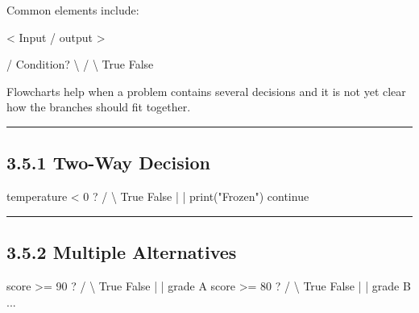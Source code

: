 \documentclass[
  11pt,
  a4paper,
]{article}
\newenvironment{Shaded}{}{}
\newcommand{\NormalTok}[1]{#1}
\begin{document}
Common elements include:

\begin{Shaded}
\begin{Highlighting}[]
\NormalTok{[ Process / task ]}

\NormalTok{\textless{} Input / output \textgreater{}}

\NormalTok{      / Condition? \textbackslash{}}
\NormalTok{     /             \textbackslash{}}
\NormalTok{  True             False}
\end{Highlighting}
\end{Shaded}

Flowcharts help when a problem contains several decisions and it is not
yet clear how the branches should fit together.

\begin{center}\rule{0.5\linewidth}{0.5pt}\end{center}

\subsection{3.5.1 Two-Way Decision}\label{two-way-decision}

\begin{Shaded}
\begin{Highlighting}[]
\NormalTok{              temperature \textless{} 0 ?}
\NormalTok{                  /        \textbackslash{}}
\NormalTok{              True        False}
\NormalTok{               |             |}
\NormalTok{        print("Frozen")    continue}
\end{Highlighting}
\end{Shaded}

\begin{center}\rule{0.5\linewidth}{0.5pt}\end{center}

\subsection{3.5.2 Multiple Alternatives}\label{multiple-alternatives-1}

\begin{Shaded}
\begin{Highlighting}[]
\NormalTok{                score \textgreater{}= 90 ?}
\NormalTok{                 /       \textbackslash{}}
\NormalTok{              True       False}
\NormalTok{               |           |}
\NormalTok{           grade A      score \textgreater{}= 80 ?}
\NormalTok{                         /       \textbackslash{}}
\NormalTok{                      True       False}
\NormalTok{                       |           |}
\NormalTok{                    grade B      ...}
\end{Highlighting}
\end{Shaded}
\end{document}
